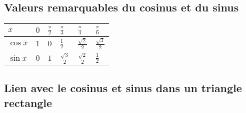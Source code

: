 \documentclass[10pt]{article}
\begin{document}
\subsection{Valeurs remarquables du cosinus et du sinus}

\renewcommand{\arraystretch}{2.5}
\begin{tabular}{|Y|Y|Y|Y|Y|Y|}
    \hline
    \large{$x$}       & \Large{$0$} & \Large{$\frac{\pi}{2}$} & \Large{$\frac{\pi}{3}$}      & \Large{$\frac{\pi}{4}$}      & \Large{$\frac{\pi}{6}$}      \\
    \hline
    \large{$\cos{x}$} & \Large{$1$} & \Large{$0$}             & \Large{$\frac{1}{2}$}        & \Large{$\frac{\sqrt{2}}{2}$} & \Large{$\frac{\sqrt{3}}{2}$} \\
    \hline
    \large{$\sin{x}$} & \Large{$0$} & \Large{$1$}             & \Large{$\frac{\sqrt{3}}{2}$} & \Large{$\frac{\sqrt{2}}{2}$} & \Large{$\frac{1}{2}$}        \\
    \hline
\end{tabular}

\subsection{Lien avec le cosinus et sinus dans un triangle rectangle}
\end{document}
